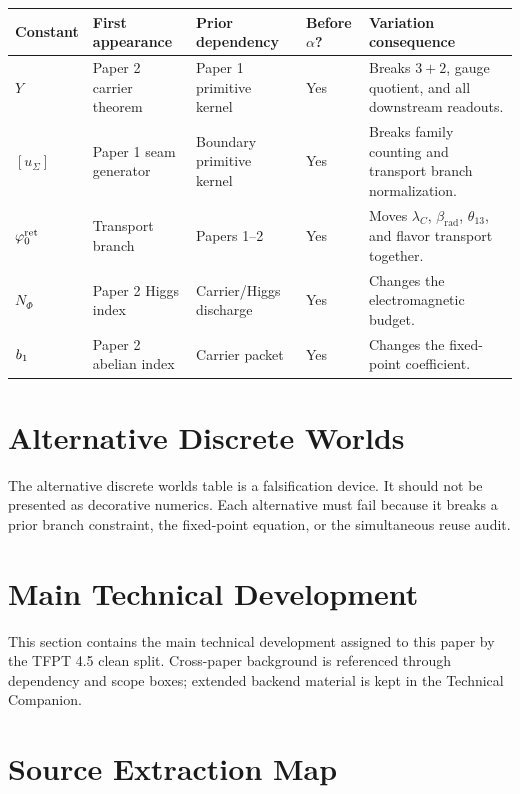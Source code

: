 \documentclass[11pt,a4paper]{article}
\begin{document}
\begin{center}
\begin{tabularx}{\textwidth}{@{}p{}p{}p{}p{}Y@{}}
\toprule
\textbf{Constant} & \textbf{First appearance} & \textbf{Prior dependency} & \textbf{Before $\alpha$?} & \textbf{Variation consequence} \\
\midrule
$Y$ & Paper 2 carrier theorem & Paper 1 primitive kernel & Yes & Breaks $3+2$, gauge quotient, and all downstream readouts. \\
$[u_\Sigma]$ & Paper 1 seam generator & Boundary primitive kernel & Yes & Breaks family counting and transport branch normalization. \\
$\varphi_0^{\mathrm{ret}}$ & Transport branch & Papers 1--2 & Yes & Moves $\lambda_C$, $\beta_{\mathrm{rad}}$, $\theta_{13}$, and flavor transport together. \\
$N_\Phi$ & Paper 2 Higgs index & Carrier/Higgs discharge & Yes & Changes the electromagnetic budget. \\
$b_1$ & Paper 2 abelian index & Carrier packet & Yes & Changes the fixed-point coefficient. \\
\bottomrule
\end{tabularx}
\end{center}

\section{Alternative Discrete Worlds}

The alternative discrete worlds table is a falsification device. It should not be presented as
decorative numerics. Each alternative must fail because it breaks a prior branch constraint, the
fixed-point equation, or the simultaneous reuse audit.

\clearpage
\section{Main Technical Development}

This section contains the main technical development assigned to this paper by the TFPT 4.5 clean split. Cross-paper background is referenced through dependency and scope boxes; extended backend material is kept in the Technical Companion.



\section{Source Extraction Map}
\end{document}
